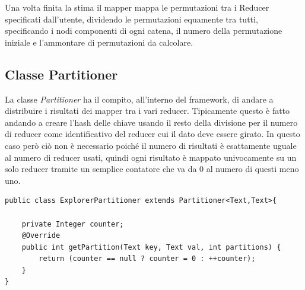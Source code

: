 \documentclass[]{IEEEtran}
\begin{document}
Una volta finita la stima il mapper mappa le permutazioni tra i Reducer specificati dall'utente, dividendo le permutazioni equamente tra tutti, specificando i nodi componenti di ogni catena, il numero della permutazione iniziale e l'ammontare di permutazioni da calcolare.

\subsection{Classe Partitioner}
La classe \emph{Partitioner} ha il compito, all'interno del framework, di andare a distribuire i risultati dei mapper tra i vari reducer. Tipicamente questo è fatto andando a creare l'hash delle chiave usando il resto della divisione per il numero di reducer come identificativo del reducer cui il dato deve essere girato. In questo caso però ciò non è necessario poiché il numero di risultati è esattamente uguale al numero di reducer usati, quindi ogni risultato è mappato univocamente su un solo reducer tramite un semplice contatore che va da 0 al numero di questi meno uno.
\begin{lstlisting}[style=javaStyle]
public class ExplorerPartitioner extends Partitioner<Text,Text>{

	private Integer counter;
	@Override
	public int getPartition(Text key, Text val, int partitions) {
		return (counter == null ? counter = 0 : ++counter);
	}
}
\end{lstlisting}
\end{document}
